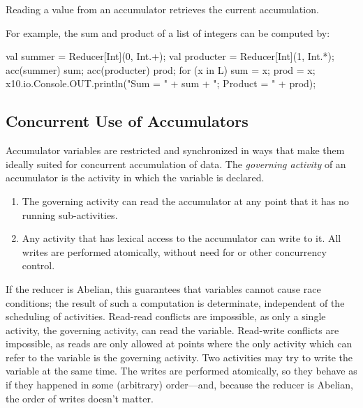 Reading a value from an accumulator retrieves the current accumulation.

For example, the sum and product of a list  of integers can be computed
by: 
\begin{xten}
val summer = Reducer[Int](0, Int.+);
val producter = Reducer[Int](1, Int.*);
acc(summer) sum;
acc(producter) prod;
for (x in L) {
  sum = x;
  prod = x;
}
x10.io.Console.OUT.println("Sum = " + sum + "; Product = " + prod);
\end{xten}
%



\subsection{Concurrent Use of Accumulators}
\label{ConcurrentUseOfAccumulators}

Accumulator variables are restricted and synchronized in ways that make them
ideally suited for concurrent accumulation of data.   The {\em governing
activity} of an accumulator is the activity in which the  variable is
declared.  

\begin{enumerate}
\item The governing activity can read the accumulator at any point that it has
      no running sub-activities.  
\item Any activity that has lexical access to the accumulator can write to it.  
      All
      writes are performed atomically, without need for  or other
      concurrency control.
\end{enumerate}

If the reducer is Abelian, this guarantees that  variables cannot
cause race conditions; the result of such a computation is determinate,
independent of the scheduling of activities. Read-read conflicts are
impossible, as only a single activity, the governing activity, can read the
 variable. Read-write conflicts are impossible, as reads are only
allowed at points where the only activity which can refer to the 
variable is the governing activity. Two activities may try to write the
 variable at the same time. The writes are performed atomically, so
they behave as if they happened in some (arbitrary) order---and, because the
reducer is Abelian, the order of writes doesn't matter.

